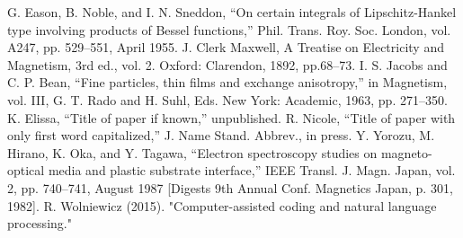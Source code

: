 \documentclass[conference]{IEEEtran}
\begin{document}
\begin{thebibliography}{00}
 G. Eason, B. Noble, and I. N. Sneddon, ``On certain integrals of Lipschitz-Hankel type involving products of Bessel functions,'' Phil. Trans. Roy. Soc. London, vol. A247, pp. 529--551, April 1955.
 J. Clerk Maxwell, A Treatise on Electricity and Magnetism, 3rd ed., vol. 2. Oxford: Clarendon, 1892, pp.68--73.
 I. S. Jacobs and C. P. Bean, ``Fine particles, thin films and exchange anisotropy,'' in Magnetism, vol. III, G. T. Rado and H. Suhl, Eds. New York: Academic, 1963, pp. 271--350.
 K. Elissa, ``Title of paper if known,'' unpublished.
 R. Nicole, ``Title of paper with only first word capitalized,'' J. Name Stand. Abbrev., in press.
 Y. Yorozu, M. Hirano, K. Oka, and Y. Tagawa, ``Electron spectroscopy studies on magneto-optical media and plastic substrate interface,'' IEEE Transl. J. Magn. Japan, vol. 2, pp. 740--741, August 1987 [Digests 9th Annual Conf. Magnetics Japan, p. 301, 1982].
 R. Wolniewicz (2015). "Computer-assisted coding and natural language processing."
\end{thebibliography}
\end{document}
